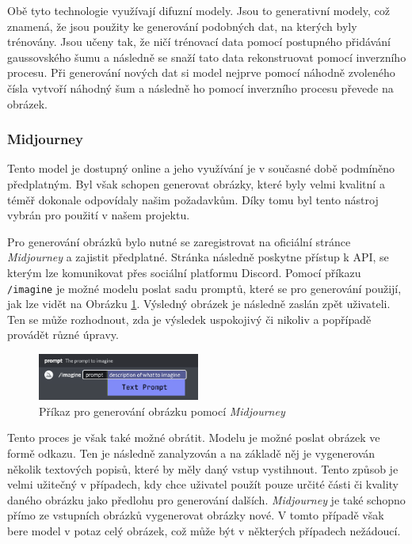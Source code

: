 Obě tyto technologie využívají difuzní modely. Jsou to generativní modely, což znamená, že jsou použity ke generování podobných dat, na kterých byly trénovány. Jsou učeny tak, že ničí trénovací data pomocí postupného přidávání gaussovského šumu a následně se snaží tato data rekonstruovat pomocí inverzního procesu. Při generování nových dat si model nejprve pomocí náhodně zvoleného čísla vytvoří náhodný šum a následně ho pomocí inverzního procesu převede na obrázek.

\subsubsection*{Midjourney}
Tento model je dostupný online a jeho využívání je v současné době podmíněno předplatným. Byl však schopen generovat obrázky, které byly velmi kvalitní a téměř dokonale odpovídaly našim požadavkům. Díky tomu byl tento nástroj vybrán pro použití v našem projektu.

Pro generování obrázků bylo nutné se zaregistrovat na oficiální stránce \textit{Midjourney} a zajistit předplatné. Stránka následně poskytne přístup k API, se kterým lze komunikovat přes sociální platformu Discord. Pomocí příkazu \texttt{/imagine} je možné modelu poslat sadu promptů, které se pro generování použijí, jak lze vidět na Obrázku \ref{fig:mj_prompts}. Výsledný obrázek je následně zaslán zpět uživateli. Ten se může rozhodnout, zda je výsledek uspokojivý či nikoliv a popřípadě provádět různé úpravy.

\begin{figure}[H]
    \centering
    \includegraphics[width=0.475\textwidth]{resources/figures/midjourney_prompts.png}
    \caption{Příkaz pro generování obrázku pomocí \textit{Midjourney} \cite{midjourney}}
    \label{fig:mj_prompts}
\end{figure}

Tento proces je však také možné obrátit. Modelu je možné poslat obrázek ve formě odkazu. Ten je následně zanalyzován a na základě něj je vygenerován několik textových popisů, které by měly daný vstup vystihnout. Tento způsob je velmi užitečný v případech, kdy chce uživatel použít pouze určité části či kvality daného obrázku jako předlohu pro generování dalších. \textit{Midjourney} je také schopno přímo ze vstupních obrázků vygenerovat obrázky nové. V tomto případě však bere model v potaz celý obrázek, což může být v některých případech nežádoucí.

